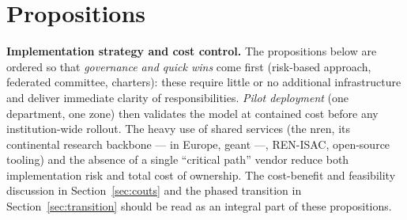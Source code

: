 \section{Propositions}
\label{sec:propositions}

\textbf{Implementation strategy and cost control.} The propositions
below are ordered so that \emph{governance and quick wins} come first
(risk-based approach, federated committee, charters): these require
little or no additional infrastructure and deliver immediate clarity
of responsibilities. \emph{Pilot deployment} (one department, one zone)
then validates the model at contained cost before any institution-wide
rollout. The heavy use of shared services (the \gls{nren}, its continental
research backbone --- in Europe, \gls{geant} ---, REN-ISAC,
open-source tooling) and the absence of a single ``critical path''
vendor reduce both implementation risk and total cost of ownership.
The cost-benefit and feasibility discussion in
Section~\ref{sec:couts} and the phased transition in
Section~\ref{sec:transition} should be read as an integral part of
these propositions.

